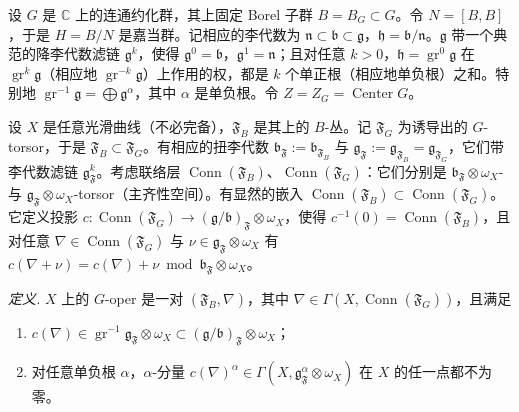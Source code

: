 


 设 $G$ 是 $\mathbb{C}$ 上的连通约化群，其上固定 Borel 子群 $B = B_G \subset G$。令 $N = [B,B]$，于是 $H = B/N$ 是嘉当群。记相应的李代数为 $\mathfrak{n} \subset \mathfrak{b} \subset \mathfrak{g}$，$\mathfrak{h} = \mathfrak{b}/\mathfrak{n}$。$\mathfrak{g}$ 带一个典范的降李代数滤链 $\mathfrak{g}^k$，使得 $\mathfrak{g}^0 = \mathfrak{b}$，$\mathfrak{g}^1 = \mathfrak{n}$；且对任意 $k > 0$，$\mathfrak{h} = \operatorname{gr}^0\mathfrak{g}$ 在 $\operatorname{gr}^k\mathfrak{g}$（相应地 $\operatorname{gr}^{-k}\mathfrak{g}$）上作用的权，都是 $k$ 个单正根（相应地单负根）之和。特别地 $\operatorname{gr}^{-1}\mathfrak{g} = \bigoplus \mathfrak{g}^{\alpha}$，其中 $\alpha$ 是单负根。令 $Z = Z_G = \operatorname{Center} G$。

 设 $X$ 是任意光滑曲线（不必完备），$\mathfrak{F}_B$ 是其上的 $B$-丛。记 $\mathfrak{F}_G$ 为诱导出的 $G$-torsor，于是 $\mathfrak{F}_B \subset \mathfrak{F}_G$。有相应的扭李代数 $\mathfrak{b}_{\mathfrak{F}} := \mathfrak{b}_{\mathfrak{F}_B}$ 与 $\mathfrak{g}_{\mathfrak{F}} := \mathfrak{g}_{\mathfrak{F}_B} = \mathfrak{g}_{\mathfrak{F}_G}$，它们带李代数滤链 $\mathfrak{g}^k_{\mathfrak{F}}$。考虑联络层 $\operatorname{Conn}(\mathfrak{F}_B)$、$\operatorname{Conn}(\mathfrak{F}_G)$：它们分别是 $\mathfrak{b}_{\mathfrak{F}}\otimes\omega_X$- 与 $\mathfrak{g}_{\mathfrak{F}}\otimes\omega_X$-torsor（主齐性空间）。有显然的嵌入 $\operatorname{Conn}(\mathfrak{F}_B) \subset \operatorname{Conn}(\mathfrak{F}_G)$。它定义投影 $c: \operatorname{Conn}(\mathfrak{F}_G) \to (\mathfrak{g}/\mathfrak{b})_{\mathfrak{F}}\otimes\omega_X$，使得 $c^{-1}(0) = \operatorname{Conn}(\mathfrak{F}_B)$，且对任意 $\nabla \in \operatorname{Conn}(\mathfrak{F}_G)$ 与 $\nu \in \mathfrak{g}_{\mathfrak{F}}\otimes\omega_X$ 有 $c(\nabla+\nu) = c(\nabla)+\nu \bmod \mathfrak{b}_{\mathfrak{F}}\otimes\omega_X$。

 \emph{定义.} $X$ 上的 $G$-oper 是一对 $(\mathfrak{F}_B,\nabla)$，其中 $\nabla \in \Gamma(X,\operatorname{Conn}(\mathfrak{F}_G))$，且满足

\begin{enumerate}[leftmargin=2.2em]
\item[(1)] $c(\nabla) \in \operatorname{gr}^{-1}\mathfrak{g}_{\mathfrak{F}}\otimes\omega_X \subset (\mathfrak{g}/\mathfrak{b})_{\mathfrak{F}}\otimes\omega_X$；
\item[(2)] 对任意单负根 $\alpha$，$\alpha$-分量 $c(\nabla)^{\alpha} \in \Gamma(X,\mathfrak{g}^{\alpha}_{\mathfrak{F}}\otimes\omega_X)$ 在 $X$ 的任一点都不为零。
\end{enumerate}

